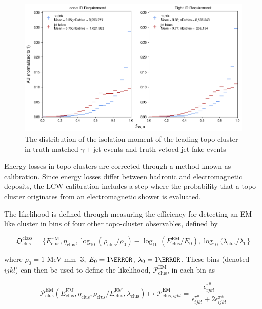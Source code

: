 \begin{figure}[!thp]
    \centering 
    \includegraphics[width=.9\textwidth]{chapters/chapter4_photonID/images/hists/y_topoCluster0_isolation.png}
    \caption[The distribution of the isolation moment of the leading topo-cluster]{The distribution of the isolation moment of the leading topo-cluster in truth-matched $\gamma+$jet events and truth-vetoed jet fake events}
    \label{fig:topo-isolation}
\end{figure}

Energy losses in topo-clusters are corrected through a method known as  calibration. Since energy losses differ between hadronic and electromagnetic deposits, the \gls{LCW} calibration includes a step where the probability that a topo-cluster originates from an electromagnetic shower is evaluated.

The likelihood is defined through measuring the efficiency for detecting an EM-like cluster in bins of four other topo-cluster observables, defined by

\begin{equation}
    \mathfrak{O}_{\text{clus}}^{\text{class}} = \{
        E_{\text{clus}}^{\text{EM}},
        \eta_{\text{clus}},
        \log_{10}(\rho_{\text{clus}} / \rho_{\text{0}}) - \log_{10}(E_{\text{clus}}^{\text{EM}} / E_{\text{0}}),
        \log_{10}(\lambda_{\text{clus}} / \lambda_{\text{0}}
    \}
\end{equation}

where $\rho_0 = 1$ MeV mm$^-3$, $E_0 = \unit{1}{\MeV}$, $\lambda_{0} = \unit{1}{\mm}$. These bins (denoted $ijkl$) can then be used to define the likelihood, $ \mathcal{P}_{\text{clus}}^{\text{EM}}$, in each bin as


\begin{equation}
    \mathcal{P}_{\text{clus}}^{\text{EM}} ( E_{\text{clus}}^{\text{EM}}, \eta_{\text{clus}}, \rho_{\text{clus}} / E_{\text{clus}}^{\text{EM}}, \lambda_{\text{clus}}) \mapsto \mathcal{P}_{\text{clus}, ijkl}^{\text{EM}}  = \frac{\epsilon^{\pi^0}_{ijkl}}{ \epsilon^{\pi^0}_{ijkl} + 2\epsilon^{\pi^\pm}_{ijkl}}
\end{equation}


